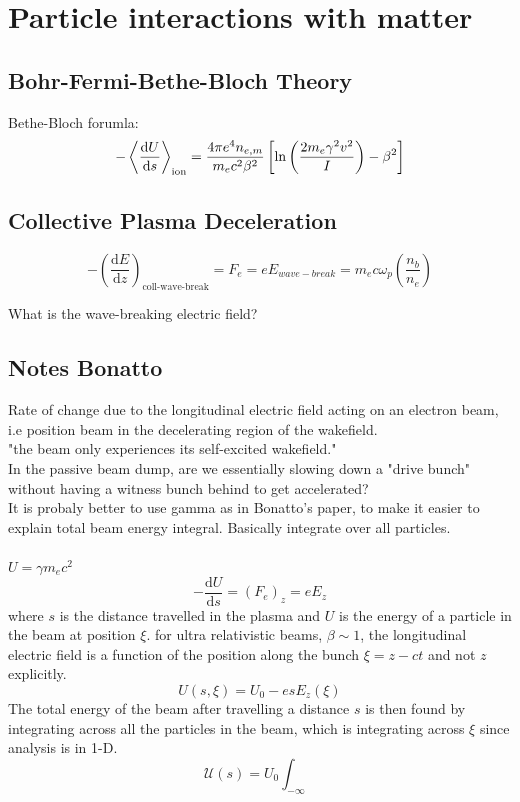 \clearpage
\section{Particle interactions with matter}
\subsection{Bohr-Fermi-Bethe-Bloch Theory}
Bethe-Bloch forumla:
\begin{equation}
-\expval{\frac{\mathrm{d}U}{\mathrm{d}s}}_{\text{ion}}=\frac{4\pi e^4n_{e,m}}{m_ec^2\beta^2}\left[\ln\left(\frac{2m_e\gamma^2v^2}{I}\right) -\beta^2\right]
\end{equation}

\subsection{Collective Plasma Deceleration}

\begin{equation}
-\left(\frac{\mathrm{d}E}{\mathrm{d}z}\right)_{\text{coll-wave-break}}=F_e=eE_{wave-break}=m_e c\omega_{p}\left(\frac{n_b}{n_e}\right)
\end{equation}

What is the wave-breaking electric field?

\subsection{Notes Bonatto}
Rate of change due to the longitudinal electric field acting on an electron beam, i.e position beam in the decelerating region of the wakefield.\\
"the beam only experiences its self-excited wakefield."\\
In the passive beam dump, are we essentially slowing down a "drive bunch" without having a witness bunch behind to get accelerated?\\
It is probaly better to use gamma as in Bonatto's paper, to make it easier to explain total beam energy integral. Basically integrate over all particles.\\
\\
$U=\gamma m_ec^2$
\begin{equation}
-\frac{\mathrm{d}U}{\mathrm{d}s}=(F_e)_z=eE_z
\end{equation}
where $s$ is the distance travelled in the plasma and $U$ is the energy of a particle in the beam at position $\xi$. 
for ultra relativistic beams, $\beta\sim 1$, the longitudinal electric field is a function of the position along the bunch $\xi=z-ct$ and not $z$ explicitly. 
\begin{equation}
U(s,\xi)=U_0-esE_z(\xi)
\end{equation}
The total energy of the beam after travelling a distance $s$ is then found by integrating across all the particles in the beam, which is integrating across $\xi$ since analysis is in 1-D.
\begin{equation}
\mathcal{U}(s)=U_0\int_{-\infty}
\end{equation}

